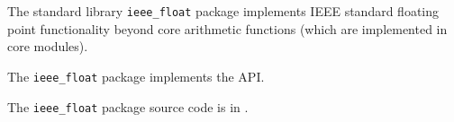 
The standard library {\tt ieee\_float} package implements {\sc IEEE} 
standard floating point 
functionality beyond core arithmetic functions (which are implemented in core modules).

The {\tt ieee\_float} package implements the  API.

The {\tt ieee\_float} package source code is in .




